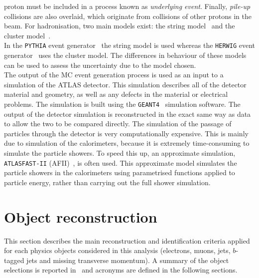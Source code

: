 proton must be included in a process known as \textit{underlying event}.
\newpage
\noindent Finally, \textit{pile-up} collisions are also overlaid, which originate from collisions of other
protons in the beam.
For hadronisation, two main models exist: the string model~\cite{string} and the cluster 
model~\cite{cluster}.\\ In the \texttt{PYTHIA} event generator~\cite{pythia} the string model is used 
whereas the \texttt{HERWIG} event generator~\cite{herwig} uses the cluster model. The 
differences in behaviour of these models can be used to assess the uncertainty due to the 
model chosen.\\
The output of the MC event generation process is used as an input to a simulation of the
ATLAS detector. This simulation describes all of the detector material and geometry, as
well as any defects in the material or electrical problems. The simulation is built using the
\texttt{GEANT4}~\cite{geant} simulation software.
The output of the detector simulation is reconstructed in the exact same way as data to allow the 
two to be compared directly.
The simulation of the passage of particles through the detector is very computationally expensive.
This is mainly due to simulation of the calorimeters, because it is extremely time-consuming
to simulate the particle showers. To speed this up, an approximate simulation, 
\texttt{ATLASFAST-II} (AFII)~\cite{afii}, is often used. This approximate model simulates the 
particle showers in the calorimeters using parametrised functions applied to particle energy, 
rather than carrying out the full shower simulation.

\newpage
\section{Object reconstruction}
This section describes the main reconstruction and identification criteria applied for each physics
objects considered in this analysis (electrons, muons, jets, $b$-tagged jets and missing transverse momentum). 
A summary of the object selections is reported in~ and acronyms are defined in the following sections. 

